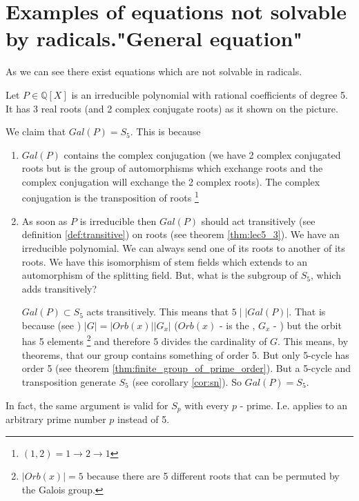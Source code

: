 \section{Examples of equations not solvable by radicals."General
  equation"}
As we can see there exist equations which are not solvable in
radicals.

\begin{example}
  Let $P \in \mathbb{Q}\left[X\right]$ is an irreducible polynomial
  with rational 
  coefficients of degree 5. It has 3 real roots (and 2 complex
  conjugate roots) as it shown on the picture.
  

  We claim that $Gal\left(P\right) = S_5$. This is because
  \begin{enumerate}
    \item $Gal\left(P\right)$ contains the complex conjugation (we
      have 2 complex conjugated roots but  is
      the group of automorphisms which exchange roots and the complex
      conjugation will exchange the 2 complex roots).
      The complex conjugation is the transposition of roots
      \footnote{
        $(1,2) = 1 \to 2 \to 1$
      }
    \item As soon as $P$ is irreducible then $Gal\left(P\right)$
      should act transitively (see definition \ref{def:transitive}) on
      roots (see theorem \ref{thm:lec5_3}). We have an irreducible
      polynomial. We can always send 
      one of its roots to another of its roots. We have this
      isomorphism of stem fields which extends to an automorphism of
      the splitting field. But, what is the subgroup of $S_5$, which adds
      transitively?

      $Gal\left(P\right) \subset S_5$ acts transitively. This means
      that $5 \mid \left|Gal\left(P\right)\right|$. That is because
      (see )
      $\left|G\right| = \left|Orb\left(x\right)\right| \left|G_x\right|$
      ($Orb\left(x\right)$ - is the ,
      $G_x$ - )
      but the orbit has 5 elements
      \footnote{
        $\left|Orb\left(x\right)\right| = 5$ because there are 5
        different roots that can be permuted by the Galois group.
      }
      and therefore 5 divides
      the cardinality of $G$. This means, by  
      theorems, that our group contains something of order 5. But only
      5-cycle has order 5 (see theorem
      \ref{thm:finite_group_of_prime_order}). 
      But a 5-cycle and transposition generate
      $S_5$ (see corollary \ref{cor:sn}).
      So $Gal\left(P\right) = S_5$.
  \end{enumerate}
  In fact, the same argument is valid for $S_p$ with every $p$ - prime. 
  I.e. applies to an arbitrary prime number $p$ instead of 5.


\end{example}
